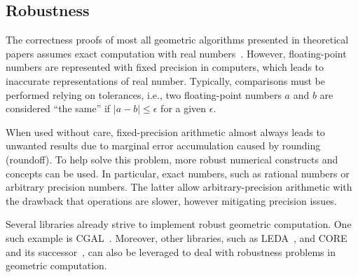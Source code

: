 \subsection{Robustness}%
\label{sec:related.robustness}

The correctness proofs of most all geometric algorithms presented in theoretical
papers assumes exact computation with real numbers~\cite{CGAL:4.13:23LGK}.
However, floating-point numbers are represented with fixed precision in
computers, which leads to inaccurate representations of real number.  Typically,
comparisons must be performed relying on tolerances, i.e., two floating-point
numbers $a$ and $b$ are considered ``the same'' if $|a - b| \le \epsilon$ for a
given $\epsilon$.

When used without care, fixed-precision arithmetic almost always leads to
unwanted results due to marginal error accumulation caused by rounding
(roundoff).  To help solve this problem, more robust numerical constructs and
concepts can be used.  In particular, exact numbers, such as rational numbers or
arbitrary precision numbers. The latter allow arbitrary-precision arithmetic
with the drawback that operations are slower, however mitigating precision
issues.

Several libraries already strive to implement robust geometric computation.  One
such example is \ac{CGAL}~\cite{CGAL:5.3:Project}.  Moreover, other libraries,
such as \ac{LEDA}~\cite{Mehlhorn:1989:LEDA}, and
CORE~\cite{Karamcheti:1999:CLRNGC} and its successor~\cite{Yu:2010:CORE2}, can
also be leveraged to deal with robustness problems in geometric computation.
